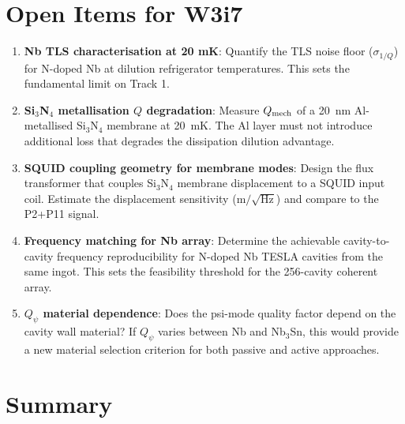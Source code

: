 \documentclass[11pt]{article}
\theoremstyle{definition}
\theoremstyle{remark}
\newcommand{\Qpsi}{Q_\psi}
\begin{document}
\section{Open Items for W3i7}
\label{sec:open}

\begin{enumerate}[nosep]
  \item \textbf{Nb TLS characterisation at 20 mK}: Quantify the TLS noise
    floor ($\sigma_{1/Q}$) for N-doped Nb at dilution refrigerator
    temperatures. This sets the fundamental limit on Track 1.
  \item \textbf{Si$_3$N$_4$ metallisation $Q$ degradation}: Measure
    $Q_{\rm mech}$ of a 20~nm Al-metallised Si$_3$N$_4$ membrane at
    20~mK. The Al layer must not introduce additional loss that degrades
    the dissipation dilution advantage.
  \item \textbf{SQUID coupling geometry for membrane modes}: Design the
    flux transformer that couples Si$_3$N$_4$ membrane displacement to
    a SQUID input coil. Estimate the displacement sensitivity
    ($\text{m}/\sqrt{\text{Hz}}$) and compare to the P2+P11 signal.
  \item \textbf{Frequency matching for Nb array}: Determine the
    achievable cavity-to-cavity frequency reproducibility for N-doped Nb
    TESLA cavities from the same ingot. This sets the feasibility
    threshold for the 256-cavity coherent array.
  \item \textbf{$\Qpsi$ material dependence}: Does the psi-mode quality
    factor depend on the cavity wall material? If $\Qpsi$ varies between
    Nb and Nb$_3$Sn, this would provide a new material selection criterion
    for both passive and active approaches.
\end{enumerate}


\section{Summary}
\label{sec:summary}
\end{document}

